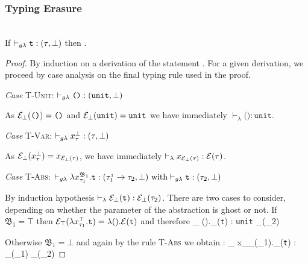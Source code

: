 \subsubsection{Typing Erasure}
\begin{lemma}~ \\
	If  $\vdash_{g\lambda} \texttt{t} : (\tau, \bot)$  
	then .
\end{lemma}
\begin{proof}
By induction on a derivation of the statement 
. 
For a given derivation, we proceed by case analysis on the final typing rule
 used in the proof. 
 
 	\noindent\textit{Case} \textsc{T-Unit}:\quad 
 	$\vdash_{g\lambda} \texttt{()} : (\texttt{unit}, \bot)$ 
 	
 		As  $\mathcal{E}_{\bot}(\texttt{()}) = \texttt{()}$ and $ \mathcal{E}_{\bot}(\texttt{unit}) = \texttt{unit}$
 		 we have immediately $\vdash_{\lambda} \texttt{()} : \texttt{unit}$.
 	
 	\noindent\textit{Case} \textsc{T-Var}:\quad 
 	$\vdash_{g\lambda} x_{\tau}^{\bot} : (\tau, \bot)$
 	 
 	 As  $\mathcal{E}_{\bot}(x_{\tau}^{\bot}) = x_{\mathcal{E}_{\bot}(\tau)}$, we have immediately 
 	 $\vdash_{\lambda} x_{\mathcal{E}_{\bot}(\tau)} : \mathcal{E}(\tau)$.
 	 

 	\noindent\textit{Case} \textsc{T-Abs}:\quad
 		$\vdash_{g\lambda} \lambda x_{\tau_{1}}^{\mathfrak{B}_{1}}.\texttt{t} : (\tau_{1}^{_{1}} \rightarrow 
 		\tau_{2}, \bot)~ \text{with} \vdash_{g\lambda} \texttt{t} : (\tau_{2}, \bot)	$
 		
 		By induction hypothesis $\vdash_{\lambda} \mathcal{E}_{\bot}(\texttt{t}) : \mathcal{E}_{\bot}(\tau_{2}) $.
 		There are two cases to consider, depending on whether the parameter 
 		of the abstraction is ghost or not. If $\mathfrak{B_{1} = \top}$ then 
 		$\mathcal{E}_{\top}(\lambda x_{\tau_{1}}^{\top}. \texttt{t}) = \lambda (). \mathcal{E}(\texttt{t})$
 		and therefore
 		{ \vdash_{\lambda} \lambda ().\e_{\bot}(\texttt{t}) : 
 		\texttt{unit} \rightarrow 	\e_{\bot}(\tau_{2})} 
 	
 		Otherwise $\mathfrak{B_{1} = \bot}$ and again by the rule \textsc{T-Abs} 
 		we obtain :
 		{ \vdash_{\lambda} \lambda x_{\e_{\bot}(\tau_{1})}.\e_{\bot}(\texttt{t}) : 
 		\e_{\bot}(\tau_{1}) \rightarrow 	\e_{\bot}(\tau_{2})}
 		

\end{proof}
